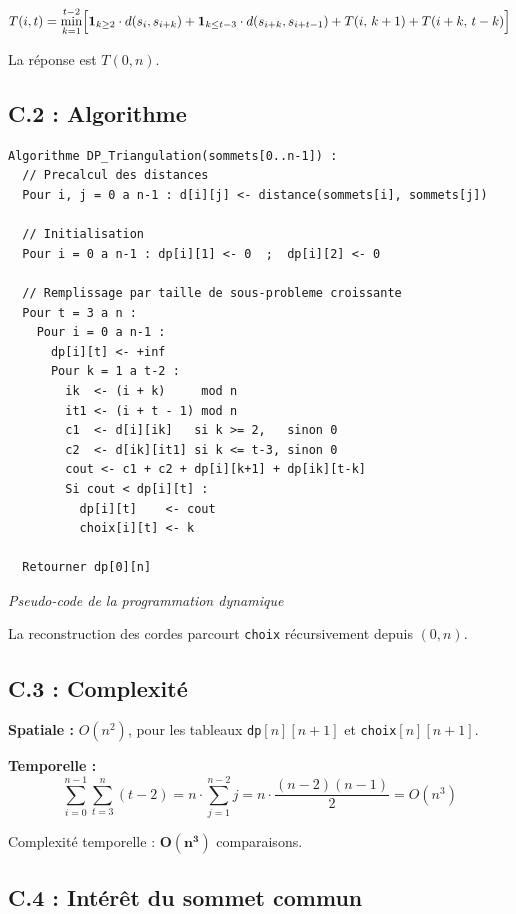 \documentclass[12pt,a4paper]{article}
\begin{document}
\[
  T(i, t) = \min_{k=1}^{t-2} \Bigl[
    \mathbf{1}_{k \geq 2}\cdot d(s_i, s_{i+k})
    + \mathbf{1}_{k \leq t-3}\cdot d(s_{i+k}, s_{i+t-1})
    + T(i,\, k+1)
    + T(i+k,\, t-k)
  \Bigr]
\]

La réponse est $T(0, n)$.

\subsection{C.2 : Algorithme}

\begin{lstlisting}[nolol, basicstyle=\ttfamily\footnotesize]
Algorithme DP_Triangulation(sommets[0..n-1]) :
  // Precalcul des distances
  Pour i, j = 0 a n-1 : d[i][j] <- distance(sommets[i], sommets[j])

  // Initialisation
  Pour i = 0 a n-1 : dp[i][1] <- 0  ;  dp[i][2] <- 0

  // Remplissage par taille de sous-probleme croissante
  Pour t = 3 a n :
    Pour i = 0 a n-1 :
      dp[i][t] <- +inf
      Pour k = 1 a t-2 :
        ik  <- (i + k)     mod n
        it1 <- (i + t - 1) mod n
        c1  <- d[i][ik]   si k >= 2,   sinon 0
        c2  <- d[ik][it1] si k <= t-3, sinon 0
        cout <- c1 + c2 + dp[i][k+1] + dp[ik][t-k]
        Si cout < dp[i][t] :
          dp[i][t]    <- cout
          choix[i][t] <- k

  Retourner dp[0][n]
\end{lstlisting}
\begin{center}
{\small\itshape Pseudo-code de la programmation dynamique}
\end{center}

La reconstruction des cordes parcourt \texttt{choix} récursivement depuis $(0, n)$.

\subsection{C.3 : Complexité}

\textbf{Spatiale :} $O(n^2)$, pour les tableaux \texttt{dp}$[n][n+1]$ et \texttt{choix}$[n][n+1]$.

\textbf{Temporelle :}
\[
  \sum_{i=0}^{n-1} \sum_{t=3}^{n} (t-2)
  = n \cdot \sum_{j=1}^{n-2} j
  = n \cdot \frac{(n-2)(n-1)}{2}
  = O(n^3)
\]

Complexité temporelle : $\mathbf{O(n^3)}$ comparaisons.

\subsection{C.4 : Intérêt du sommet commun}
\end{document}
